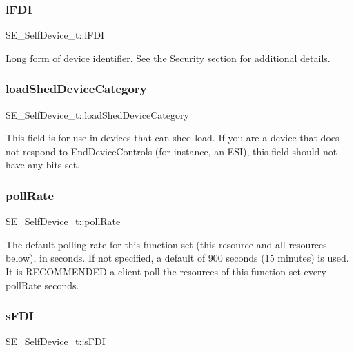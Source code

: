 \subsubsection{\texorpdfstring{l\+F\+DI}{lFDI}}
{\footnotesize\ttfamily S\+E\+\_\+\+Self\+Device\+\_\+t\+::l\+F\+DI}

Long form of device identifier. See the Security section for additional details. \mbox{\label{group__SelfDevice_ga8c97bdb8ed0564bd06baf603e87f586c}} 
\subsubsection{\texorpdfstring{load\+Shed\+Device\+Category}{loadShedDeviceCategory}}
{\footnotesize\ttfamily S\+E\+\_\+\+Self\+Device\+\_\+t\+::load\+Shed\+Device\+Category}

This field is for use in devices that can shed load. If you are a device that does not respond to End\+Device\+Controls (for instance, an E\+SI), this field should not have any bits set. \mbox{\label{group__SelfDevice_ga3a1b571c04f84d22a2fd7b3bfe32e487}} 
\subsubsection{\texorpdfstring{poll\+Rate}{pollRate}}
{\footnotesize\ttfamily S\+E\+\_\+\+Self\+Device\+\_\+t\+::poll\+Rate}

The default polling rate for this function set (this resource and all resources below), in seconds. If not specified, a default of 900 seconds (15 minutes) is used. It is R\+E\+C\+O\+M\+M\+E\+N\+D\+ED a client poll the resources of this function set every poll\+Rate seconds. \mbox{\label{group__SelfDevice_ga751d47704f76026ac661f82420bb9248}} 
\subsubsection{\texorpdfstring{s\+F\+DI}{sFDI}}
{\footnotesize\ttfamily S\+E\+\_\+\+Self\+Device\+\_\+t\+::s\+F\+DI}

